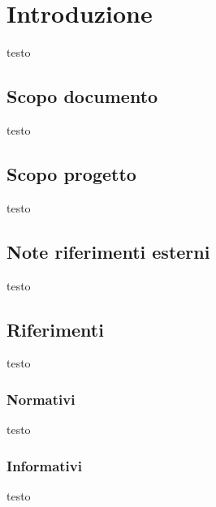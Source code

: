 \section{Introduzione}
testo

	\subsection{Scopo documento}
	testo
	
	\subsection{Scopo progetto}
	testo
	
	\subsection{Note riferimenti esterni}
	testo

	\subsection{Riferimenti}
	testo

	\subsubsection{Normativi}
	testo

	\subsubsection{Informativi}
	testo